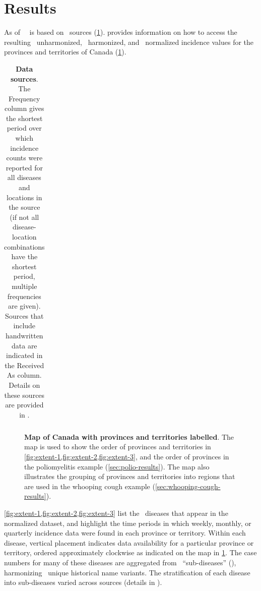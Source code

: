 \documentclass[12pt]{article}
\begin{document}
\section{Results}\label{sec:results}

As of \asofnow\ \datacronym\ is based on \ sources (\cref{tab:sources-table}).  provides information on how to access the resulting \ unharmonized, \ harmonized, and \ normalized incidence values for the provinces and territories of Canada (\cref{fig:map}).

\begin{table}[!htb]
  \centering
  \caption{\textbf{Data sources}. The Frequency column gives the shortest period over which incidence counts were reported for all diseases and locations in the source (if not all disease-location combinations have the shortest period, multiple frequencies are given). Sources that include handwritten data are indicated in the Received As column. Details on these sources are provided in .} 
  \begin{tabular}{ll>{\raggedright\arraybackslash}p{0.11\linewidth}>{\raggedright\arraybackslash}p{0.25\linewidth}>{\raggedright\arraybackslash}p{0.2\linewidth}}  

\end{tabular}
\label{tab:sources-table}
\end{table}

\begin{figure}[!htb]
\caption{\textbf{Map of Canada with provinces and territories labelled}. The map is used to show the order of provinces and territories in \cref{fig:extent-1,fig:extent-2,fig:extent-3}, and the order of provinces in the poliomyelitis example (\cref{sec:polio-results}). The map also illustrates the grouping of provinces and territories into regions that are used in the whooping cough example (\cref{sec:whooping-cough-results}).}\label{fig:map}
\end{figure}

\newpage 

\cref{fig:extent-1,fig:extent-2,fig:extent-3} list the \ diseases that appear in the normalized dataset, and highlight the time periods in which weekly, monthly, or quarterly incidence data were found in each province or territory. Within each disease, vertical placement indicates data availability for a particular province or territory, ordered approximately clockwise as indicated on the map in \cref{fig:map}. The case numbers for many of these diseases are aggregated from \ ``sub-diseases'' (), harmonizing \ unique historical name variants. The stratification of each disease into sub-diseases varied across sources (details in ).
\end{document}
